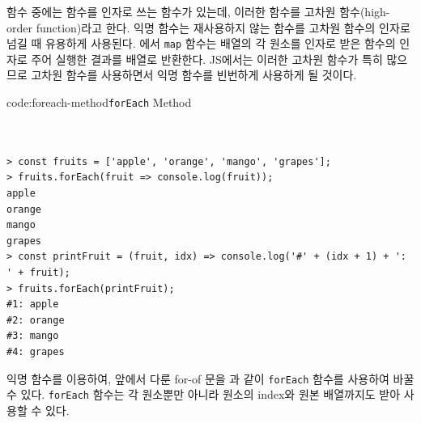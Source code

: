 함수 중에는 함수를 인자로 쓰는 함수가 있는데, 이러한 함수를 고차원 함수(high-order function)라고 한다. 익명 함수는 재사용하지 않는 함수를 고차원 함수의 인자로 넘길 때 유용하게 사용된다. 에서 \texttt{map} 함수는 배열의 각 원소를 인자로 받은 함수의 인자로 주어 실행한 결과를 배열로 반환한다. JS에서는 이러한 고차원 함수가 특히 많으므로 고차원 함수를 사용하면서 익명 함수를 빈번하게 사용하게 될 것이다.

\begin{codeenv}{code:foreach-method}{\texttt{forEach} Method}\begin{verbatim}


> const fruits = ['apple', 'orange', 'mango', 'grapes'];
> fruits.forEach(fruit => console.log(fruit));
apple
orange
mango
grapes
> const printFruit = (fruit, idx) => console.log('#' + (idx + 1) + ': ' + fruit);
> fruits.forEach(printFruit);
#1: apple
#2: orange
#3: mango
#4: grapes
\end{verbatim}
\end{codeenv}

익명 함수를 이용하여, 앞에서 다룬 for-of 문을 과 같이 \texttt{forEach} 함수를 사용하여 바꿀 수 있다. \texttt{forEach} 함수는 각 원소뿐만 아니라 원소의 index와 원본 배열까지도 받아 사용할 수 있다.
